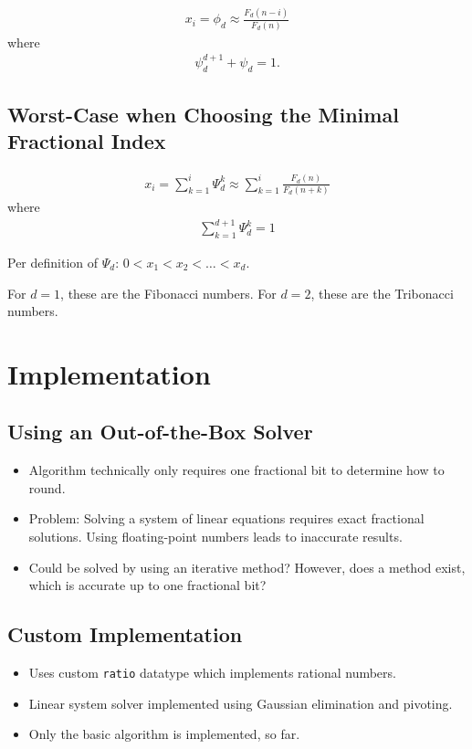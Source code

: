 \documentclass[english,version-2020-11]{uzl-thesis}
\begin{document}
\begin{align*}
  x_i = \phi_d \approx \frac{F_d(n - i)}{F_d(n)}
\end{align*}
where
\begin{align*}
  \psi_d^{d+1} + \psi_d = 1.
\end{align*}

\section{Worst-Case when Choosing the Minimal Fractional Index}

\begin{align*}
  x_i = \sum_{k=1}^i \Psi_d^k \approx \sum_{k=1}^i \frac{F_d(n)}{F_d(n+k)}
\end{align*}
where
\begin{align*}
  \sum_{k=1}^{d+1} \Psi_d^k = 1
\end{align*}

Per definition of $\Psi_d$: $0 < x_1 < x_2 < \dots < x_d$.

For $d = 1$, these are the Fibonacci numbers.
For $d = 2$, these are the Tribonacci numbers.


\chapter{Implementation}

\section{Using an Out-of-the-Box Solver}

\begin{itemize}
  \item Algorithm technically only requires one fractional bit to determine how to round.
  \item Problem: Solving a system of linear equations requires exact fractional solutions.
    Using floating-point numbers leads to inaccurate results.
  \item Could be solved by using an iterative method? However, does a method
    exist, which is accurate up to one fractional bit?
\end{itemize}

\section{Custom Implementation}

\begin{itemize}
  \item Uses custom \texttt{ratio} datatype which implements rational numbers.
  \item Linear system solver implemented using Gaussian elimination and pivoting.
  \item Only the basic algorithm is implemented, so far.
\end{itemize}

\begin{bibtex-entries}
\end{bibtex-entries}
\end{document}
